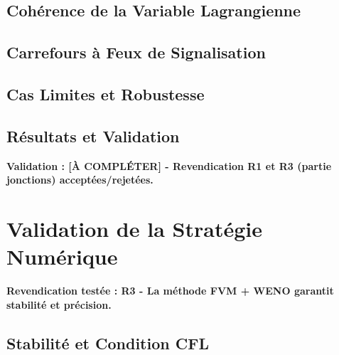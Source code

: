 \subsection{Cohérence de la Variable Lagrangienne}
\label{subsec:coherence_variable_w}

\subsection{Carrefours à Feux de Signalisation}
\label{subsec:carrefours_feux}

\subsection{Cas Limites et Robustesse}
\label{subsec:cas_limites_jonctions}

\subsection{Résultats et Validation}
\label{subsec:resultats_jonctions}

\textbf{Validation : [À COMPLÉTER] - Revendication R1 et R3 (partie jonctions) acceptées/rejetées.}

\section{Validation de la Stratégie Numérique}
\label{sec:validation_numerique}

\textbf{Revendication testée : R3 - La méthode FVM + WENO garantit stabilité et précision.}

\subsection{Stabilité et Condition CFL}
\label{subsec:stabilite_cfl}


